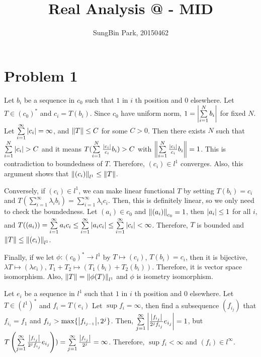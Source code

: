 \documentclass{article}
\makeatletter
\newcommand*{\rom}[1]{\expandafter\@slowromancap\romannumeral #1@}
\makeatother
\begin{document}
\title{Real Analysis \rom{2} - MID}
\author{SungBin Park, 20150462} 

\maketitle

\section*{Problem 1}
Let $b_i$ be a sequence in $c_0$ such that $1$ in $i$ th position and 0 elsewhere. Let $T\in (c_0)^*$ and $c_i=T(b_i)$. Since $c_0$ have uniform norm, $1=\abs{\sum\limits_{i=1}^N b_i}$ for fixed $N$. Let $\sum\limits_{i=1}^\infty \abs{c_i}=\infty$, and $\norm{T}\leq C$ for some $C>0$. Then there exists $N$ such that $\sum\limits_{i=1}^N \abs{c_i}>C$ and it means $T(\sum\limits_{i=1}^N \frac{\abs{c_i}}{c_i}b_i)>C$ with $\norm{\sum\limits_{i=1}^N \frac{\abs{c_i}}{c_i}b_i}=1$. This is contradiction to boundedness of $T$. Therefore, $(c_i)\in l^1$ converges. Also, this argument shows that $\norm{(c_i)}_{l^1}\leq \norm{T}$. 

Conversely, if $(c_i)\in l^1$, we can make linear functional $T$ by setting $T(b_i)=c_i$ and $T(\sum\limits_{i=1}^\infty \lambda_i b_i)=\sum\limits_{i=1}^\infty \lambda_i c_i$. Then, this is definitely linear, so we only need to check the boundedness. Let $(a_i)\in c_0$ and $\norm{(a_i)}_{c_0}=1$, then $\abs{a_i}\leq 1$ for all $i$, and $T((a_i))=\sum\limits_{i=1}^\infty a_i c_i\leq \sum\limits_{i=1}^\infty \abs{a_ic_i}\leq \sum\limits_{i=1}^\infty \abs{c_i}<\infty$. Therefore, $T$ is bounded and $\norm{T}\leq \norm{(c_i)}_{l^1}$.

Finally, if we let $\phi:(c_0)^*\rightarrow l^1$ by $T\mapsto (c_i)$, $T(b_i)=c_i$, then it is bijective, $\lambda T\mapsto (\lambda c_i)$, $T_1+T_2\mapsto (T_1(b_i)+T_2(b_i))$. Therefore, it is vector space isomorphism. Also, $\norm{T}=\norm{\phi(T)}_{l^1}$ and $\phi$ is isometry isomorphism.

Let $e_i$ be a sequence in $l^1$ such that $1$ in $i$ th position and 0 elsewhere. Let $T\in (l^1)^*$ and $f_i=T(e_i)$ Let $\sup f_i=\infty$, then find a subsequence $(f_{i_j})$ that $f_{i_1}=f_1$ and $f_{i_j}>\max\{\abs{f_{i_{j-1}}}, 2^j\}$. Then, $\sum\limits_{j=1}^\infty \abs{\frac{\abs{f_{i_j}}}{2^jf_{i_j}}e_{i_j}}=1$, but $T\left(\sum\limits_{j=1}^\infty \frac{\abs{f_{i_j}}}{2^j f_{i_j}}e_{i_j}\right))=\sum\limits_{j=1}^\infty \frac{\abs{f_{i_j}}}{2^j}=\infty$. Therefore, $\sup f_i<\infty$ and $(f_i)\in l^\infty$.
\end{document}
